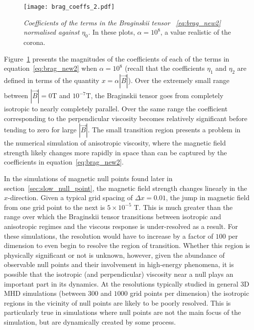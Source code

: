 \begin{figure}[t]
  \centering
  \texttt{[image: brag\_coeffs\_2.pdf]}
  \caption{\emph{Coefficients of the terms in the Braginskii tensor ~\eqref{eq:brag_new2} normalised against $\eta_0$.} In these plots, $\alpha = 10^{8}$, a value realistic of the corona.}%
  \label{fig:brag_coeffs2}
\end{figure}

Figure~\ref{fig:brag_coeffs2} presents the magnitudes of the coefficients of each of the terms in equation~\eqref{eq:brag_new2} when $\alpha = 10^{8}$ (recall that the coefficients $\eta_1$ and $\eta_2$ are defined in terms of the quantity $x=\alpha |\vec{B}|$). Over the extremely small range between $|\vec{B}| = 0$T and $10^{-7}$T, the Braginskii tensor goes from completely isotropic to nearly completely parallel. Over the same range the coefficient corresponding to the perpendicular viscosity becomes relatively significant before tending to zero for large $|\vec{B}|$. The small transition region presents a problem in the numerical simulation of anisotropic viscosity, where the magnetic field strength likely changes more rapidly in space than can be captured by the coefficients in equation~\eqref{eq:brag_new2}.

In the simulations of magnetic null points found later in section~\ref{sec:slow_null_point}, the magnetic field strength changes linearly in the $x$-direction. Given a typical grid spacing of $\Delta x = 0.01$, the jump in magnetic field from one grid point to the next is $5\times 10^{-5}$ T. This is much greater than the range over which the Braginskii tensor transitions between isotropic and anisotropic regimes and the viscous response is under-resolved as a result. For these simulations, the resolution would have to increase by a factor of $100$ per dimension to even begin to resolve the region of transition. Whether this region is physically significant or not is unknown, however, given the abundance of observable null points and their involvement in high-energy phenomena, it is possible that the isotropic (and perpendicular) viscosity near a null plays an important part in its dynamics. At the resolutions typically studied in general 3D MHD simulations (between $300$ and $1000$ grid points per dimension) the isotropic regions in the vicinity of null points are likely to be poorly resolved. This is particularly true in simulations where null points are not the main focus of the simulation, but are dynamically created by some process.

